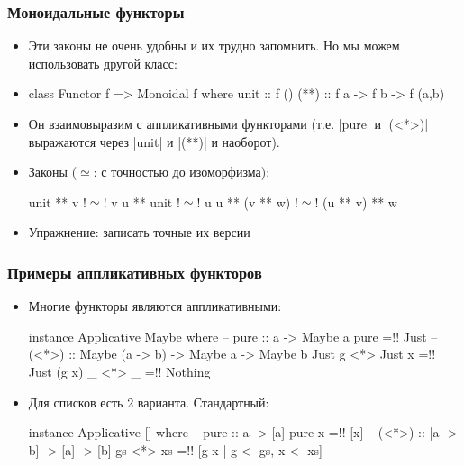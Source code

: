 \documentclass[11pt]{beamer}
\begin{document}
\begin{frame}[fragile]
  \frametitle{Моноидальные функторы}
  \begin{itemize}
    \item Эти законы не очень удобны и их трудно запомнить. Но мы можем использовать другой класс:
    \item
          \begin{haskell}
            class Functor f => Monoidal f where
              unit :: f ()
              (**) :: f a -> f b -> f (a,b)
          \end{haskell}
    \item Он взаимовыразим с аппликативными функторами (т.е. \haskinline|pure| и \haskinline|(<*>)| выражаются через \haskinline|unit| и \haskinline|(**)| и наоборот).
    \item Законы ($\simeq$: с точностью до изоморфизма):
          \begin{haskell}
            unit ** v !$\simeq$! v
            u ** unit !$\simeq$! u
            u ** (v ** w) !$\simeq$! (u ** v) ** w
          \end{haskell}
    \item Упражнение: записать точные их версии
  \end{itemize}
\end{frame}

\begin{frame}[fragile]
  \frametitle{Примеры аппликативных функторов}
  \begin{itemize}
    \item Многие функторы являются аппликативными:
          \begin{haskell}
            instance Applicative Maybe where
              -- pure :: a -> Maybe a
              pure =!\pause! Just
              -- (<*>) :: Maybe (a -> b) -> Maybe a -> Maybe b
              Just g <*> Just x  =!\pause! Just (g x)
              _      <*> _       =!\pause! Nothing
          \end{haskell}
          \pause
    \item Для списков есть 2 варианта. Стандартный:
          \begin{haskell}
            instance Applicative [] where 
              -- pure :: a -> [a]
              pure x =!\pause! [x]
              -- (<*>) :: [a -> b] -> [a] -> [b]
              gs <*> xs =!\pause! [g x | g <- gs, x <- xs]
          \end{haskell}
  \end{itemize}
\end{frame}
\end{document}
